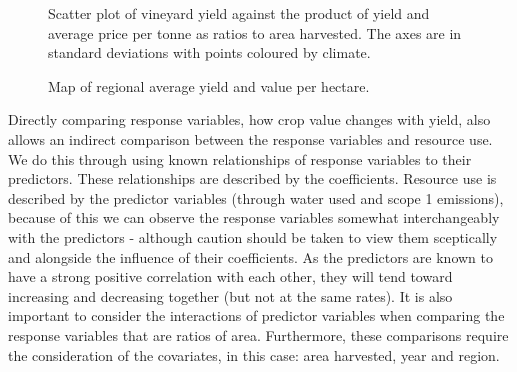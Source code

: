 \documentclass[review,12pt,authoryear]{elsarticle}
\begin{document}
\begin{linenumbers}
\begin{figure}
    \caption{Scatter plot of vineyard yield against the product of yield and average price per tonne as ratios to area harvested. The axes are in standard deviations with points coloured by climate.}\label{fig:yield_vs_value_area}
\end{figure}
%
\begin{figure}
  \caption{Map of regional average yield and value per hectare.}\label{fig:map}
\end{figure}
%
%
Directly comparing response variables, how crop value changes with yield, also allows an indirect comparison between the response variables and resource use. We do this through using known relationships of response variables to their predictors. These relationships are described by the coefficients. Resource use is described by the predictor variables (through water used and scope 1 emissions), because of this we can observe the response variables somewhat interchangeably with the predictors - although caution should be taken to view them sceptically and alongside the influence of their coefficients. As the predictors are known to have a strong positive correlation with each other, they will tend toward increasing and decreasing together (but not at the same rates). It is also important to consider the interactions of predictor variables when comparing the response variables that are ratios of area. Furthermore, these comparisons require the consideration of the covariates, in this case: area harvested, year and region.

\end{linenumbers}
\end{document}
